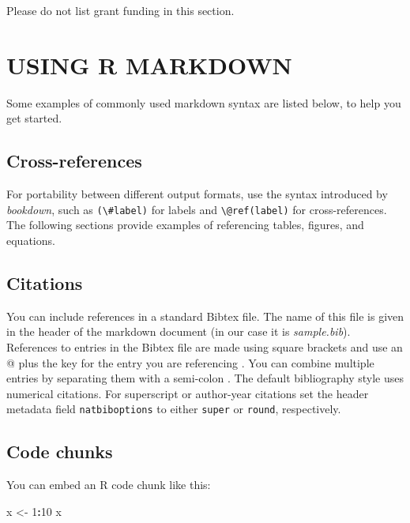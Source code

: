 \documentclass[9pt,a4paper,]{extarticle}
\newenvironment{Shaded}{\begin{snugshade}}{\end{snugshade}}
\newcommand{\DecValTok}[1]{\textcolor[rgb]{0.00,0.00,0.81}{#1}}
\newcommand{\NormalTok}[1]{#1}
\newcommand{\OperatorTok}[1]{\textcolor[rgb]{0.81,0.36,0.00}{\textbf{#1}}}
\newcommand{\StringTok}[1]{\textcolor[rgb]{0.31,0.60,0.02}{#1}}
\begin{document}
Please do not list grant funding in this section.

\hypertarget{using-r-markdown}{%
\section{USING R MARKDOWN}\label{using-r-markdown}}

Some examples of commonly used markdown syntax are listed below, to help you get started.

\hypertarget{cross-references}{%
\subsection{Cross-references}\label{cross-references}}

For portability between different output formats, use the syntax introduced by \emph{bookdown}, such as \texttt{(\textbackslash{}\#label)} for labels and \texttt{\textbackslash{}@ref(label)} for cross-references. The following sections provide examples of referencing tables, figures, and equations.

\hypertarget{citations}{%
\subsection{Citations}\label{citations}}

You can include references in a standard Bibtex file. The name of this file is given in the header of the markdown document (in our case it is \emph{sample.bib}). References to entries in the Bibtex file are made using square brackets and use an @ plus the key for the entry you are referencing \citep{Smith:2012qr}. You can combine multiple entries by separating them with a semi-colon \citep{Smith:2012qr, Smith:2013jd}.
The default bibliography style uses numerical citations. For superscript or author-year citations set the header metadata field \texttt{natbiboptions} to either \texttt{super} or \texttt{round}, respectively.

\hypertarget{code-chunks}{%
\subsection{Code chunks}\label{code-chunks}}

You can embed an R code chunk like this:

\begin{Shaded}
\begin{Highlighting}[]
\NormalTok{x <-}\StringTok{ }\DecValTok{1}\OperatorTok{:}\DecValTok{10}
\NormalTok{x}
\end{Highlighting}
\end{Shaded}
\end{document}
